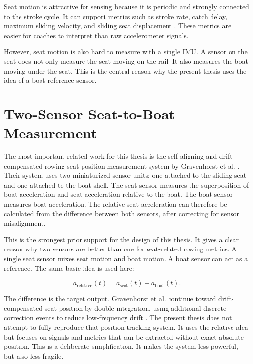 Seat motion is attractive for sensing because it is periodic and strongly connected to the stroke cycle. It can support metrics such as stroke rate, catch delay, maximum sliding velocity, and sliding seat displacement \cite{gravenhorst_sonicseat_2012}. These metrics are easier for coaches to interpret than raw accelerometer signals.

However, seat motion is also hard to measure with a single IMU. A sensor on the seat does not only measure the seat moving on the rail. It also measures the boat moving under the seat. This is the central reason why the present thesis uses the idea of a boat reference sensor.

\section{Two-Sensor Seat-to-Boat Measurement}

The most important related work for this thesis is the self-aligning and drift-compensated rowing seat position measurement system by Gravenhorst et al. \cite{gravenhorst_self-aligning_2012}. Their system uses two miniaturized sensor units: one attached to the sliding seat and one attached to the boat shell. The seat sensor measures the superposition of boat acceleration and seat acceleration relative to the boat. The boat sensor measures boat acceleration. The relative seat acceleration can therefore be calculated from the difference between both sensors, after correcting for sensor misalignment.

This is the strongest prior support for the design of this thesis. It gives a clear reason why two sensors are better than one for seat-related rowing metrics. A single seat sensor mixes seat motion and boat motion. A boat sensor can act as a reference. The same basic idea is used here:

\begin{equation}
  a_{\text{relative}}(t) = a_{\text{seat}}(t) - a_{\text{boat}}(t).
\end{equation}

The difference is the target output. Gravenhorst et al. continue toward drift-compensated seat position by double integration, using additional discrete correction events to reduce low-frequency drift \cite{gravenhorst_self-aligning_2012}. The present thesis does not attempt to fully reproduce that position-tracking system. It uses the relative idea but focuses on signals and metrics that can be extracted without exact absolute position. This is a deliberate simplification. It makes the system less powerful, but also less fragile.

